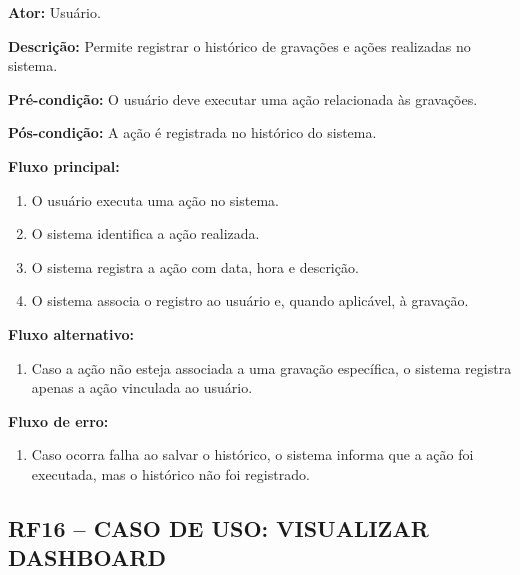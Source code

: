 \documentclass[12pt,oneside,a4paper,brazil,final]{abntex2}
\begin{document}
\textbf{Ator:} Usuário.



\textbf{Descrição:} Permite registrar o histórico de gravações e ações realizadas no sistema.



\textbf{Pré-condição:} O usuário deve executar uma ação relacionada às gravações.



\textbf{Pós-condição:} A ação é registrada no histórico do sistema.



\textbf{Fluxo principal:}

\begin{enumerate}

    \item O usuário executa uma ação no sistema.

    \item O sistema identifica a ação realizada.

    \item O sistema registra a ação com data, hora e descrição.

    \item O sistema associa o registro ao usuário e, quando aplicável, à gravação.

\end{enumerate}



\textbf{Fluxo alternativo:}

\begin{enumerate}

    \item Caso a ação não esteja associada a uma gravação específica, o sistema registra apenas a ação vinculada ao usuário.

\end{enumerate}



\textbf{Fluxo de erro:}

\begin{enumerate}

    \item Caso ocorra falha ao salvar o histórico, o sistema informa que a ação foi executada, mas o histórico não foi registrado.

\end{enumerate}



\clearpage
\subsection*{RF16 -- CASO DE USO: VISUALIZAR DASHBOARD}
\end{document}
